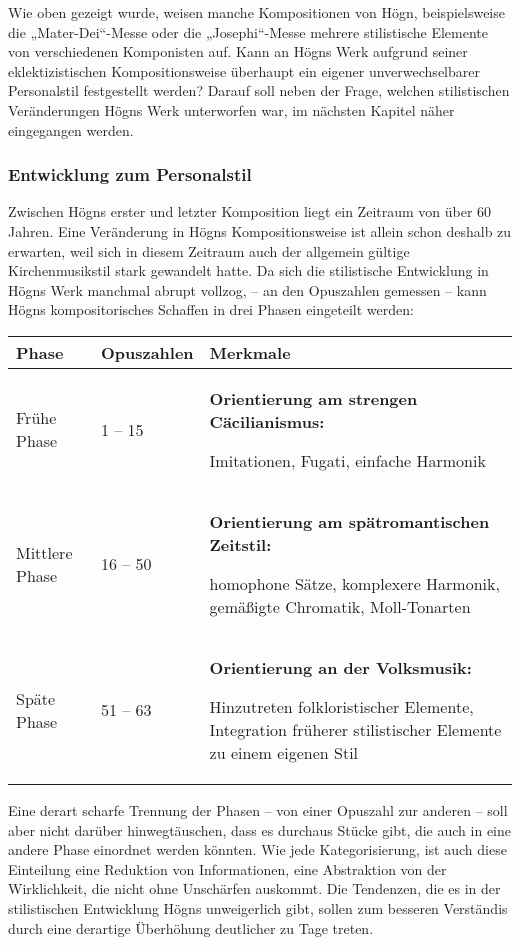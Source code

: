 \documentclass[a4paper]{article}
\begin{document}
Wie oben gezeigt wurde, weisen manche Kompositionen von Högn,
beispielsweise die „Mater-Dei“-Messe oder die „Josephi“-Messe mehrere
stilistische Elemente von verschiedenen Komponisten auf. Kann an Högns
Werk aufgrund seiner eklektizistischen Kompositionsweise überhaupt ein
eigener unverwechselbarer Personalstil festgestellt werden? Darauf soll
neben der Frage, welchen stilistischen Veränderungen Högns Werk
unterworfen war, im nächsten Kapitel näher eingegangen werden.

\subsubsection{Entwicklung zum Personalstil}
\hypertarget{RefHeadingToc100333751}{}Zwischen Högns erster und letzter
Komposition liegt ein Zeitraum von über 60 Jahren. Eine Veränderung in
Högns Kompositionsweise ist allein schon deshalb zu erwarten, weil sich
in diesem Zeitraum auch der allgemein gültige Kirchenmusikstil stark
gewandelt hatte. Da sich die stilistische Entwicklung in Högns Werk
manchmal abrupt vollzog, – an den Opuszahlen gemessen – kann Högns
kompositorisches Schaffen in drei Phasen eingeteilt werden:

\begin{flushleft}
\tablefirsthead{}
\tablehead{}
\tabletail{}
\tablelasttail{}
\begin{supertabular}{|m{3.166cm}|m{2.763cm}|m{9.734cm}|}
\hline
{\bfseries Phase} &
{\bfseries Opuszahlen} &
{\bfseries Merkmale}\\\hline
Frühe Phase &
1 – 15 &
{\bfseries Orientierung am strengen Cäcilianismus: }

Imitationen, Fugati, einfache Harmonik\\\hline
Mittlere Phase &
16 – 50 &
\textbf{Orientierung am spätromantischen Zeitstil:}

homophone Sätze, komplexere Harmonik, gemäßigte Chromatik,
Moll-Tonarten\\\hline
Späte Phase &
51 – 63 &
\textbf{Orientierung an der Volksmusik:}

Hinzutreten folkloristischer Elemente, Integration früherer
stilistischer Elemente zu einem eigenen Stil \\\hline
\end{supertabular}
\end{flushleft}
Eine derart scharfe Trennung der Phasen – von einer Opuszahl zur anderen
– soll aber nicht darüber hinwegtäuschen, dass es durchaus Stücke gibt,
die auch in eine andere Phase einordnet werden könnten. Wie jede
Kategorisierung, ist auch diese Einteilung eine Reduktion von
Informationen, eine Abstraktion von der Wirklichkeit, die nicht ohne
Unschärfen auskommt. Die Tendenzen, die es in der stilistischen
Entwicklung Högns unweigerlich gibt, sollen zum besseren Verständis
durch eine derartige Überhöhung deutlicher zu Tage treten.
\end{document}
